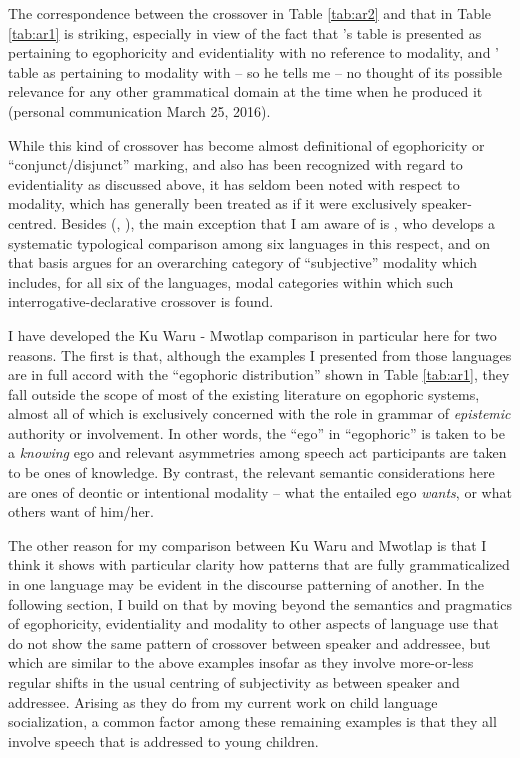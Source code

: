 \documentclass[output=paper]{langsci/langscibook}
\begin{document}

The correspondence between the crossover in Table \ref{tab:ar2} and that in Table \ref{tab:ar1} is striking, especially in view of the fact that \citeauthor{SanRoqueSchieffelin2018}’s table is presented as pertaining to egophoricity and evidentiality with no reference to modality, and \citeauthor{Francois2003}’ table as pertaining to modality with – so he tells me – no thought of its possible relevance for any other grammatical domain at the time when he produced it (personal communication March 25, 2016). 

While this kind of crossover has become almost definitional of egophoricity or “conjunct/disjunct” marking, and also has been recognized with regard to evidentiality as discussed above, it has seldom been noted with respect to modality, which has generally been treated as if it were exclusively speaker-centred. Besides \citeauthor{François2003} (\citeyear{Francois2003}, \citeyear{Francois2004}), the main exception that I am aware of is \cite{Lehmann2012}, who develops a systematic typological comparison among six languages in this respect, and on that basis argues for an overarching category of “subjective” modality which includes, for all six of the languages, modal categories within which such interrogative-declarative crossover is found.

I have developed the Ku Waru - Mwotlap comparison in particular here for two reasons.  The first is that, although the examples I presented from those languages are in full accord with the “egophoric distribution” shown in Table \ref{tab:ar1}, they fall outside the scope of most of the existing literature on egophoric systems, almost all of which is exclusively concerned with the role in grammar of \textit{epistemic} authority or involvement. In other words, the “ego” in “egophoric” is taken to be a \textit{knowing} ego and relevant asymmetries among speech act participants are taken to be ones of knowledge. By contrast, the relevant semantic considerations here are ones of deontic or intentional modality – what the entailed ego \textit{wants}, or what others want of him/her. 

The other reason for my comparison between Ku Waru and Mwotlap is that I think it shows with particular clarity how patterns that are fully grammaticalized in one language may be evident in the discourse patterning of another. In the following section, I build on that by moving beyond the semantics and pragmatics of egophoricity, evidentiality and modality to other aspects of language use that do not show the same pattern of crossover between speaker and addressee, but which are similar to the above examples insofar as they involve more-or-less regular shifts in the usual centring of subjectivity as between speaker and addressee.  Arising as they do from my current work on child language socialization, a common factor among these remaining examples is that they all involve speech that is addressed to young children.
\end{document}
